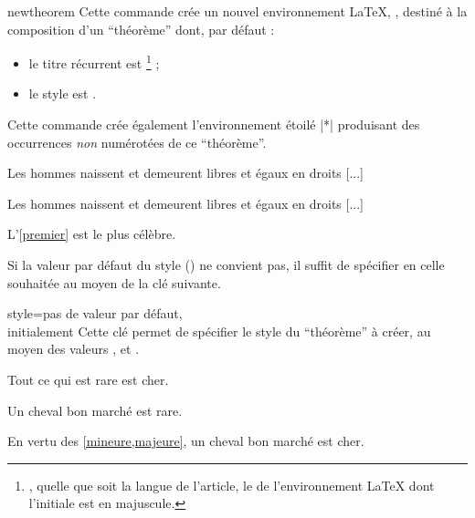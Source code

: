 \documentclass[english,nolocaltoc]{nwejmart}
\newtheorem{article}
\newtheorem[style=definition]{fait}
\newtheorem[title=expérience]{experience}
\newtheorem[title-plural=anneaux]{anneau}
\newtheorem[title=idéal,title-plural=idéaux]{ideal}
\begin{document}
\begin{docCommand}{newtheorem}{}
  Cette commande crée un nouvel environnement \LaTeX{}, , destiné à la
  composition d'un \enquote{théorème} dont, par défaut :
  \begin{itemize}
  \item le titre récurrent est \footnote{\Ie*{}, quelle que soit la
      langue de l'article, le  de l'environnement \LaTeX{} dont
      l'initiale est en majuscule.} ;
  \item le style est .
  \end{itemize}
  Cette commande crée également l'environnement étoilé |*| produisant
  des occurrences \emph{non} numérotées de ce \enquote{théorème}.

\begin{bodycode}[listing and text,listing options={deletekeywords={[2]article,label}}]
\begin{article*}
Les hommes naissent et demeurent libres et égaux en droits [...]
\end{article*}
\begin{article}\label{premier}
Les hommes naissent et demeurent libres et égaux en droits [...]
\end{article}
L'\vref{premier} est le plus célèbre.
\end{bodycode}

  Si la valeur par défaut du style () ne convient pas, il
  suffit de spécifier en  celle souhaitée au moyen de la clé
   suivante.
  \begin{docKey}{style}{=\textbar{}\textbar{}}{pas
      de valeur par défaut,\\initialement {}}
    Cette clé permet de spécifier le style du \enquote{théorème} à créer, au
    moyen des valeurs ,  et
    .
  \end{docKey}
\begin{bodycode}[listing and text,listing options={deletekeywords={[2]label}}]
\begin{fait}\label{majeure}
Tout ce qui est rare est cher.
\end{fait}
\begin{fait}\label{mineure}
Un cheval bon marché est rare.
\end{fait}
En vertu des \cref{mineure,majeure}, un cheval bon marché est
cher.
\end{bodycode}


\end{docCommand}
\end{document}
